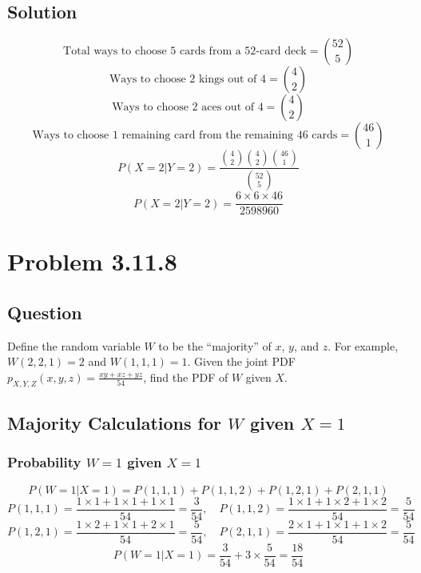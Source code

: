 \documentclass[12pt]{article}
\begin{document}
\subsection*{Solution}
\[
\text{Total ways to choose 5 cards from a 52-card deck} = \binom{52}{5}
\]
\[
\text{Ways to choose 2 kings out of 4} = \binom{4}{2}
\]
\[
\text{Ways to choose 2 aces out of 4} = \binom{4}{2}
\]
\[
\text{Ways to choose 1 remaining card from the remaining 46 cards} = \binom{46}{1}
\]
\[
P(X = 2 | Y = 2) = \frac{\binom{4}{2} \binom{4}{2} \binom{46}{1}}{\binom{52}{5}}
\]
\[
P(X = 2 | Y = 2) = \frac{6 \times 6 \times 46}{2598960}
\]
\pagebreak

\section*{Problem 3.11.8}
\subsection*{Question}
Define the random variable \( W \) to be the ``majority'' of \( x \), \( y \), and \( z \). For example, \( W(2, 2, 1) = 2 \) and \( W(1, 1, 1) = 1 \). Given the joint PDF \( p_{X,Y,Z}(x, y, z) = \frac{xy + xz + yz}{54} \), find the PDF of \( W \) given \( X \).

\subsection*{Majority Calculations for \( W \) given \( X = 1 \)}
\subsubsection*{Probability \( W = 1 \) given \( X = 1 \)}
\[
P(W = 1 | X = 1) = P(1, 1, 1) + P(1, 1, 2) + P(1, 2, 1) + P(2, 1, 1)
\]
\[
P(1, 1, 1) = \frac{1 \times 1 + 1 \times 1 + 1 \times 1}{54} = \frac{3}{54}, \quad
P(1, 1, 2) = \frac{1 \times 1 + 1 \times 2 + 1 \times 2}{54} = \frac{5}{54}
\]
\[
P(1, 2, 1) = \frac{1 \times 2 + 1 \times 1 + 2 \times 1}{54} = \frac{5}{54}, \quad
P(2, 1, 1) = \frac{2 \times 1 + 1 \times 1 + 1 \times 2}{54} = \frac{5}{54}
\]
\[
P(W = 1 | X = 1) = \frac{3}{54} + 3 \times \frac{5}{54} = \frac{18}{54}
\]
\end{document}
